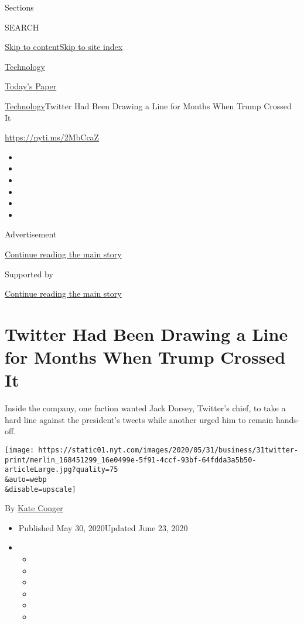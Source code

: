 Sections

SEARCH

\protect\hyperlink{site-content}{Skip to
content}\protect\hyperlink{site-index}{Skip to site index}

\href{https://www.nytimes.com/section/technology}{Technology}

\href{https://myaccount.nytimes.com/auth/login?response_type=cookie\&client_id=vi}{}

\href{https://www.nytimes.com/section/todayspaper}{Today's Paper}

\href{/section/technology}{Technology}\textbar{}Twitter Had Been Drawing
a Line for Months When Trump Crossed It

\url{https://nyti.ms/2MbCcaZ}

\begin{itemize}
\item
\item
\item
\item
\item
\item
\end{itemize}

Advertisement

\protect\hyperlink{after-top}{Continue reading the main story}

Supported by

\protect\hyperlink{after-sponsor}{Continue reading the main story}

\hypertarget{twitter-had-been-drawing-a-line-for-months-when-trump-crossed-it}{%
\section{Twitter Had Been Drawing a Line for Months When Trump Crossed
It}\label{twitter-had-been-drawing-a-line-for-months-when-trump-crossed-it}}

Inside the company, one faction wanted Jack Dorsey, Twitter's chief, to
take a hard line against the president's tweets while another urged him
to remain hands-off.

\texttt{[image: https://static01.nyt.com/images/2020/05/31/business/31twitter-print/merlin\_168451299\_16e0499e-5f91-4ccf-93bf-64fdda3a5b50-articleLarge.jpg?quality=75\\\&auto=webp\\\&disable=upscale]}

By \href{https://www.nytimes.com/by/kate-conger}{Kate Conger}

\begin{itemize}
\item
  Published May 30, 2020Updated June 23, 2020
\item
  \begin{itemize}
  \item
  \item
  \item
  \item
  \item
  \item
  \end{itemize}
\end{itemize}


